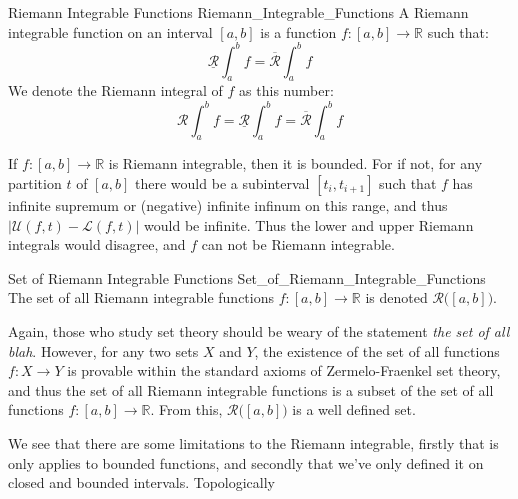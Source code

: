 \documentclass[crop=false,class=article]{standalone}                           %
\begin{document}
        \begin{fdefinition}{Riemann Integrable Functions}
                           {Riemann_Integrable_Functions}
            A Riemann integrable function on an interval $[a,b]$ is a
            function $f:[a,b]\rightarrow\mathbb{R}$ such that:
            \begin{equation}
                \underline{\mathcal{R}}\int_{a}^{b}f
                =\overline{\mathcal{R}}\int_{a}^{b}f
            \end{equation}
            We denote the Riemann integral of $f$ as this number:
            \begin{equation}
                \mathcal{R}\int_{a}^{b}f
                =\underline{\mathcal{R}}\int_{a}^{b}f
                =\overline{\mathcal{R}}\int_{a}^{b}f
            \end{equation}
        \end{fdefinition}
        If $f:[a,b]\rightarrow\mathbb{R}$ is Riemann integrable, then it is
        bounded. For if not, for any partition $t$ of $[a,b]$ there would be a
        subinterval $[t_{i},t_{i+1}]$ such that $f$ has infinite supremum or
        (negative) infinite infinum on this range, and thus
        $|\mathcal{U}(f,t)-\mathcal{L}(f,t)|$ would be infinite. Thus the lower
        and upper Riemann integrals would disagree, and $f$ can not be Riemann
        integrable.
        \begin{fnotation}{Set of Riemann Integrable Functions}
                         {Set_of_Riemann_Integrable_Functions}
            The set of all Riemann integrable functions
            $f:[a,b]\rightarrow\mathbb{R}$ is denoted
            $\mathcal{R}\big([a,b]\big)$.
        \end{fnotation}
        Again, those who study set theory should be weary of the statement
        \textit{the set of all blah}. However, for any two sets $X$ and $Y$, the
        existence of the set of all functions $f:X\rightarrow{Y}$ is provable
        within the standard axioms of Zermelo-Fraenkel set theory, and thus the
        set of all Riemann integrable functions is a subset of the set of all
        functions $f:[a,b]\rightarrow\mathbb{R}$. From this,
        $\mathcal{R}\big([a,b]\big)$ is a well defined set.
        \par\hfill\par
        We see that there are some limitations to the Riemann integrable,
        firstly that is only applies to bounded functions, and secondly that
        we've only defined it on closed and bounded intervals. Topologically
\end{document}
